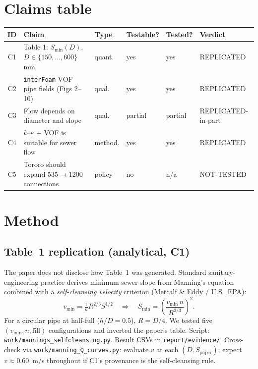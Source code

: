 \documentclass[11pt,a4paper]{article}
\begin{document}
\section{Claims table}
\begin{center}\small
\begin{tabular}{clllll}
\toprule
ID & Claim & Type & Testable? & Tested? & Verdict \\
\midrule
C1 & Table 1: $S_{\min}(D)$, $D\in\{150,\dots,600\}$ mm & quant. & yes & yes & REPLICATED \\
C2 & \texttt{interFoam} VOF pipe fields (Figs 2--10) & qual. & yes & yes & REPLICATED \\
C3 & Flow depends on diameter and slope & qual. & partial & partial & REPLICATED-in-part \\
C4 & $k$--$\varepsilon$ + VOF is suitable for sewer flow & method. & yes & yes & REPLICATED \\
C5 & Tororo should expand 535$\to$1200 connections & policy & no & n/a & NOT-TESTED \\
\bottomrule
\end{tabular}
\end{center}

\section{Method}
\subsection{Table~1 replication (analytical, C1)}
The paper does not disclose how Table~1 was generated. Standard
sanitary-engineering practice derives minimum sewer slope from Manning's
equation combined with a \emph{self-cleansing velocity} criterion
(Metcalf \& Eddy / U.S.\ EPA):
\begin{equation}
v_{\min} = \tfrac{1}{n} R^{2/3} S^{1/2}
\quad\Longrightarrow\quad
S_{\min} = \left(\frac{v_{\min}\, n}{R^{2/3}}\right)^{2}.
\end{equation}
For a circular pipe at half-full ($h/D=0.5$), $R = D/4$. We tested five
$(v_{\min}, n, \text{fill})$ configurations and inverted the paper's table.
Script: \texttt{work/mannings\_selfcleansing.py}. Result CSVs in
\texttt{report/evidence/}. Cross-check via \texttt{work/manning\_Q\_curves.py}:
evaluate $v$ at each $(D, S_{\text{paper}})$; expect $v\approx 0.60$~m/s
throughout if C1's provenance is the self-cleansing rule.
\end{document}
